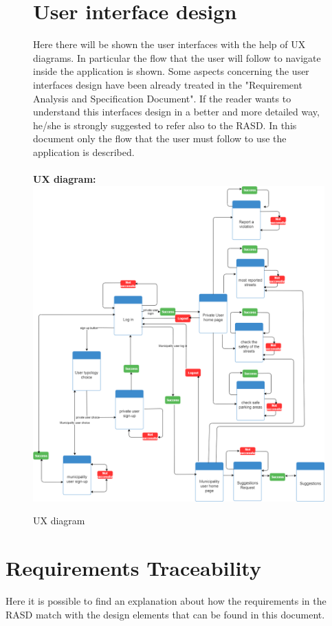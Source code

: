 \documentclass[titlepage]{article}
\begin{document}
\begin{figure}[h]
	\section{User interface design}
Here there will be shown the user interfaces with the help of UX diagrams. In particular the flow that the user will follow to navigate inside the application is shown. Some aspects concerning the user interfaces design have been already treated in the "Requirement Analysis and Specification Document". If the reader wants to understand this interfaces design in a better and more detailed way, he/she is strongly suggested to refer also to the RASD. In this document only the flow that the user must follow to use the application is described. \\ \\
\textbf{UX diagram:\\}
	\includegraphics[scale=0.4]{Diagrams/UX diagram.png}
	\caption{UX diagram}
\end{figure}
\FloatBarrier
\section{ Requirements Traceability}
Here it is possible to find an explanation about how the requirements in the RASD match with the design elements that can be found in this document.
\end{document}
